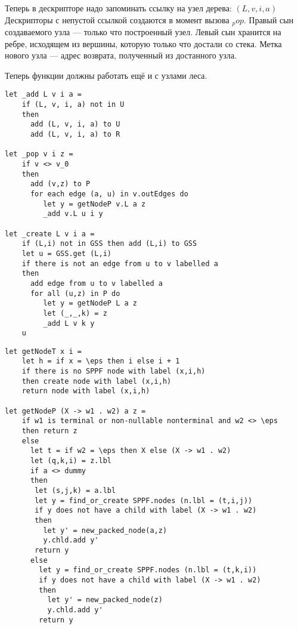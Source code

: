 \documentclass[12pt]{article}  %
\theoremstyle{definition}
\theoremstyle{remark}
\begin{document}
Теперь в дескрипторе надо запоминать ссылку на узел дерева: $(L, v, i, a)$
Дескрипторы с непустой ссылкой создаются в момент вызова $_pop$. Правый сын создаваемого узла --- только что построенный узел. Левый сын хранится на ребре, исходящем из вершины, которую только что достали со стека.
Метка нового узла --- адрес возврата, полученный из достанного узла.

Теперь функции должны работать ещё и с узлами леса.

\begin{verbatim}
let _add L v i a = 
    if (L, v, i, a) not in U 
    then 
      add (L, v, i, a) to U
      add (L, v, i, a) to R

let _pop v i z =
    if v <> v_0
    then
      add (v,z) to P
      for each edge (a, u) in v.outEdges do 
         let y = getNodeP v.L a z
         _add v.L u i y

let _create L v i a =
    if (L,i) not in GSS then add (L,i) to GSS
    let u = GSS.get (L,i)
    if there is not an edge from u to v labelled a
    then
      add edge from u to v labelled a
      for all (u,z) in P do 
         let y = getNodeP L a z
         let (_,_,k) = z
         _add L v k y
    u
\end{verbatim}

\begin{verbatim}
let getNodeT x i = 
    let h = if x = \eps then i else i + 1
    if there is no SPPF node with label (x,i,h)
    then create node with label (x,i,h) 
    return node with label (x,i,h) 

let getNodeP (X -> w1 . w2) a z =
    if w1 is terminal or non-nullable nonterminal and w2 <> \eps
    then return z
    else 
      let t = if w2 = \eps then X else (X -> w1 . w2)
      let (q,k,i) = z.lbl
      if a <> dummy
      then
       let (s,j,k) = a.lbl
       let y = find_or_create SPPF.nodes (n.lbl = (t,i,j))
       if y does not have a child with label (X -> w1 . w2)
       then
         let y' = new_packed_node(a,z)
         y.chld.add y'
       return y
      else
        let y = find_or_create SPPF.nodes (n.lbl = (t,k,i))   
        if y does not have a child with label (X -> w1 . w2)
        then
          let y' = new_packed_node(z)
          y.chld.add y'
        return y

\end{verbatim}
\end{document}
